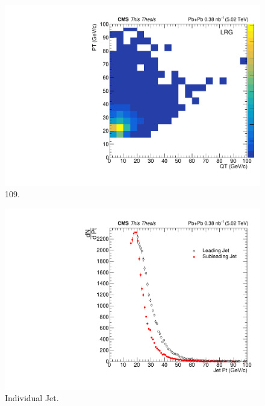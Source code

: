 \begin{figure}[h!]
\begin{centering}
\includegraphics[width=5in]{Chapter6/importfigs/109_thesis.pdf}
\par\end{centering}
\caption{109. \label{fig:109}}
\end{figure}

\begin{figure}[h!]
\begin{centering}
\includegraphics[width=5in]{Chapter6/importfigs/individualJet_thesis.pdf}
\par\end{centering}
\caption{Individual Jet. \label{fig:individualJet}}
\end{figure}
